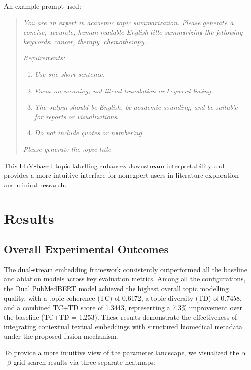 \documentclass[utf8]{FrontiersinHarvard}
\begin{document}
An example prompt used:

\begin{quote}
\textit{You are an expert in academic topic summarization. Please generate a concise, accurate, human-readable English title summarizing the following keywords: cancer, therapy, chemotherapy.}

\textit{Requirements:}
\begin{enumerate}
    \item \textit{Use one short sentence.}
    \item \textit{Focus on meaning, not literal translation or keyword listing.}
    \item \textit{The output should be English, be academic sounding, and be suitable for reports or visualizations.}
    \item \textit{Do not include quotes or numbering.}
\end{enumerate}

\textit{Please generate the topic title}
\end{quote}

This LLM-based topic labelling enhances downstream interpretability and provides a more intuitive interface for nonexpert users in literature exploration and clinical research.

\section{Results}

\subsection{Overall Experimental Outcomes}

The dual-stream embedding framework consistently outperformed all the baseline and ablation models across key evaluation metrics. Among all the configurations, the Dual PubMedBERT model achieved the highest overall topic modelling quality, with a topic coherence (TC) of 0.6172, a topic diversity (TD) of 0.7458, and a combined TC+TD score of 1.3443, representing a 7.3\% improvement over the baseline (TC+TD = 1.253). These results demonstrate the effectiveness of integrating contextual textual embeddings with structured biomedical metadata under the proposed fusion mechanism.

To provide a more intuitive view of the parameter landscape, we visualized the $\alpha$--$\beta$ grid search results via three separate heatmaps:
\end{document}
